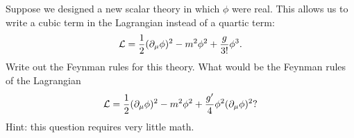 \begin{problem}
\end{problem}

\begin{problem}
  Suppose we designed a new scalar theory in which $\phi$ were real. This allows us to write a cubic term in the Lagrangian instead of a quartic term:
  $$\mathcal{L} = \frac{1}{2}(\partial_\mu \phi)^2 - m^2 \phi^2 + \frac{g}{3!}\phi^3.$$
  Write out the Feynman rules for this theory. What would be the Feynman rules of the Lagrangian
  $$\mathcal{L} = \frac{1}{2}(\partial_\mu \phi)^2 - m^2 \phi^2 + \frac{g'}{4}\phi^2(\partial_\mu \phi)^2?$$
  Hint: this question requires very little math.
\end{problem}